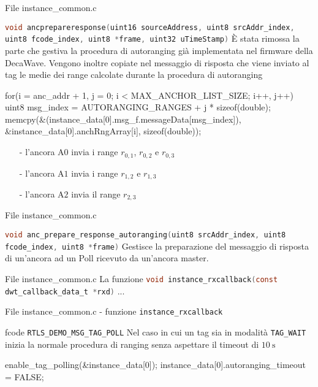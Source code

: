 \begin{frame}[fragile,shrink=20]{File instance\_common.c}
  \begin{block}{\lstinline[language=C]!void ancprepareresponse(uint16 sourceAddress, uint8 srcAddr_index, uint8 fcode_index, uint8 *frame, uint32 uTimeStamp)!}
    È stata rimossa la parte che gestiva la procedura di autoranging già implementata nel firmware della DecaWave. Vengono inoltre copiate nel messaggio
    di risposta che viene inviato al tag le medie dei range calcolate durante la procedura di autoranging
    \begin{C}
      for(i = anc_addr + 1, j = 0; i < MAX_ANCHOR_LIST_SIZE; i++, j++)
      {
        uint8 msg_index = AUTORANGING_RANGES + j * sizeof(double);
        memcpy(&(instance_data[0].msg_f.messageData[msg_index]), &instance_data[0].anchRngArray[i], sizeof(double));
      }
    \end{C}
    \begin{itemize}
    \item[-] l'ancora A$0$ invia i range $r_{0,1}$, $r_{0,2}$ e $r_{0,3}$
    \item[-] l'ancora A$1$ invia i range $r_{1,2}$ e $r_{1,3}$
    \item[-] l'ancora A$2$ invia il range $r_{2,3}$
    \end{itemize}
  \end{block}
\end{frame}

\begin{frame}{File instance\_common.c}
  \begin{block}{\lstinline[language=C]!void anc_prepare_response_autoranging(uint8 srcAddr_index, uint8 fcode_index, uint8 *frame)!}
    Gestisce la preparazione del messaggio di risposta di un'ancora ad un Poll ricevuto da un'ancora master.
  \end{block}
\end{frame}

\begin{frame}{File instance\_common.c}
  La funzione \lstinline[language=C]!void instance_rxcallback(const dwt_callback_data_t *rxd)! ...
\end{frame}

\begin{frame}[fragile]{File instance\_common.c - funzione \lstinline[language=C]!instance_rxcallback!}
  \begin{block}{fcode \lstinline[language=C]!RTLS_DEMO_MSG_TAG_POLL!}
    Nel caso in cui un tag sia in modalità \lstinline[language=C]!TAG_WAIT! inizia la normale procedura di ranging senza aspettare il timeout di $\SI{10}{\second}$
    \begin{C}
      enable_tag_polling(&instance_data[0]);
      instance_data[0].autoranging_timeout = FALSE;
    \end{C}
  \end{block}
\end{frame}

